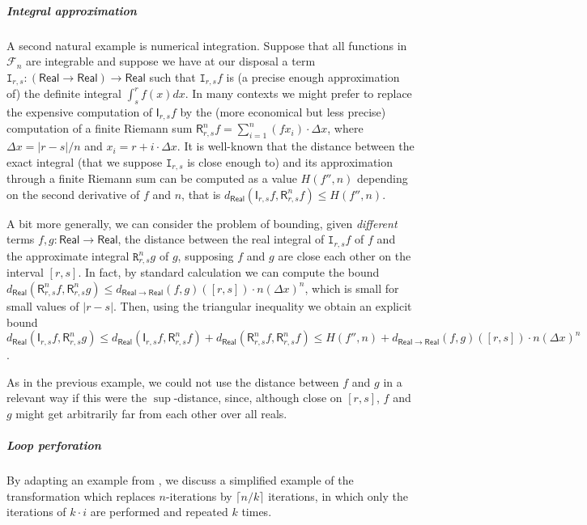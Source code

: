 \subparagraph*{Integral approximation}
A second natural example is numerical integration. Suppose that all functions in $\mathcal F_{n}$ are integrable and suppose we have at our disposal a term $\mathtt I_{r,s}: (\mathsf{Real}\to \mathsf{Real})\to \mathsf{Real}$ such that $\mathtt I_{r,s}f$ is (a precise enough approximation of) the definite integral $\int_{s}^{r}f(x)dx$.
In many contexts we might prefer to replace the expensive computation of $\mathsf I_{r,s}f$ by the (more economical but less precise) computation of a finite Riemann sum $\mathsf R^{n}_{r,s}f=  \sum_{i=1}^{n}(f x_{i})\cdot \Delta x$, where $\Delta x= |r-s|/n$ and $x_{i}= r+ i\cdot \Delta x$. 
It is well-known that the distance between the exact integral (that we suppose $\mathtt I_{r,s}$ is close enough to) and its approximation through a finite Riemann sum can be computed as a value $H(f'', n)$ depending on the second derivative of $f$ and $n$, that is
$d_{\mathsf{Real}}(\mathsf I_{r,s}f, \mathsf R^{n}_{r,s}f)\leq H(f'',n)$.

A bit more generally, we can consider the problem of bounding, given \emph{different} terms $f,g:\mathsf{Real}\to \mathsf{Real}$, the distance between the real integral of $\mathtt I_{r,s}f$ of $f$ and the approximate integral $\mathtt R^{n}_{r,s}g$ of $g$, supposing $f$ and $g$ are close each other on the interval $[r,s]$. 
 In fact, by standard calculation we can compute the bound
$d_{\mathsf{Real}} ( \mathsf{R}^{n}_{r,s}f, \mathsf R^{n}_{r,s}g)\leq 
d_{\mathsf{Real}\to\mathsf{Real}}(f, g)([r,s]) \cdot n (\Delta x)^{n}
$, which is small for small values of $|r-s|$. Then,
 using the triangular inequality we obtain an explicit bound
$d_{\mathsf{Real}} ( \mathsf{I}_{r,s}f, \mathsf R^{n}_{r,s}g)\leq
 d_{\mathsf{Real}} ( \mathsf{I}_{r,s}f, \mathsf R^{n}_{r,s}f)+
  d_{\mathsf{Real}} ( \mathsf{R}^{n}_{r,s}f, \mathsf R^{n}_{r,s}f)\leq 
 H(f'',n)+
d_{\mathsf{Real}\to\mathsf{Real}}(f, g)([r,s]) \cdot n (\Delta x)^{n}
$.

As in the previous example, we could not use the distance between $f$ and $g$ in a relevant way if this were the $\sup$-distance, since, although close on $[r,s]$, $f$ and $g$ might get arbitrarily far from each other over all reals. 



\subparagraph*{Loop perforation}
By adapting an example from \cite{chaudhuri}, we discuss a simplified example of the transformation which replaces $n$-iterations by $\lceil n/k \rceil$ iterations, in which only the iterations of $k\cdot i$ are performed and repeated $k$ times. 


